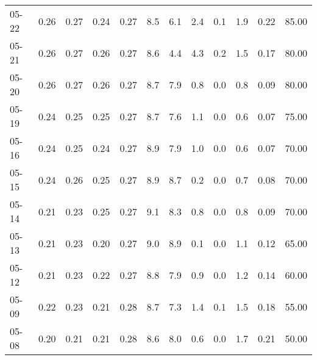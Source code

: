 \begin{threeparttable}
{\begin{tabular}{lrrrrrrrrrrr}
  05-22 &          0.26 &          0.27 &          0.24 &        0.27 &                 8.5 &                 6.1 &        2.4 &                 0.1 &              1.9 &            0.22 &                  85.00 \\
  05-21 &          0.26 &          0.27 &          0.26 &        0.27 &                 8.6 &                 4.4 &        4.3 &                 0.2 &              1.5 &            0.17 &                  80.00 \\
  05-20 &          0.26 &          0.27 &          0.26 &        0.27 &                 8.7 &                 7.9 &        0.8 &                 0.0 &              0.8 &            0.09 &                  80.00 \\
  05-19 &          0.24 &          0.25 &          0.25 &        0.27 &                 8.7 &                 7.6 &        1.1 &                 0.0 &              0.6 &            0.07 &                  75.00 \\
  05-16 &          0.24 &          0.25 &          0.24 &        0.27 &                 8.9 &                 7.9 &        1.0 &                 0.0 &              0.6 &            0.07 &                  70.00 \\
  05-15 &          0.24 &          0.26 &          0.25 &        0.27 &                 8.9 &                 8.7 &        0.2 &                 0.0 &              0.7 &            0.08 &                  70.00 \\
  05-14 &          0.21 &          0.23 &          0.25 &        0.27 &                 9.1 &                 8.3 &        0.8 &                 0.0 &              0.8 &            0.09 &                  70.00 \\
  05-13 &          0.21 &          0.23 &          0.20 &        0.27 &                 9.0 &                 8.9 &        0.1 &                 0.0 &              1.1 &            0.12 &                  65.00 \\
  05-12 &          0.21 &          0.23 &          0.22 &        0.27 &                 8.8 &                 7.9 &        0.9 &                 0.0 &              1.2 &            0.14 &                  60.00 \\
  05-09 &          0.22 &          0.23 &          0.21 &        0.28 &                 8.7 &                 7.3 &        1.4 &                 0.1 &              1.5 &            0.18 &                  55.00 \\
  05-08 &          0.20 &          0.21 &          0.21 &        0.28 &                 8.6 &                 8.0 &        0.6 &                 0.0 &              1.7 &            0.21 &                  50.00 \\

\end{tabular}}
\end{threeparttable}
